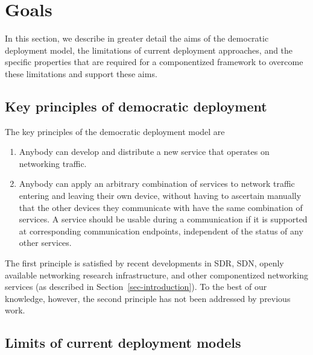 \section{Goals}
\label{sec-goals}

In this section, we describe in greater detail the aims of 
the democratic deployment model, the limitations
of current deployment approaches, and the specific 
properties that are required for a componentized 
framework to overcome these limitations and support these aims. 

\subsection{Key principles of democratic deployment}

The key principles of the democratic deployment model 
are
\begin{enumerate}
\item Anybody can develop and distribute 
a new service that operates on networking
traffic.
\item Anybody can apply an arbitrary combination of services
to network traffic entering and leaving their own device, without 
having to ascertain manually that the other devices they communicate 
with have the same combination of services. 
A service should be usable during a communication 
if it is supported at corresponding communication endpoints, 
independent of the status of any other services.
\end{enumerate}

The first principle is satisfied by recent developments
in SDR, SDN, openly available networking research infrastructure, 
and other componentized networking services 
(as described in Section~\ref{sec-introduction}). 
To the best of our knowledge, however, the second principle
has not been addressed by previous work.

\subsection{Limits of current deployment models}
\label{subsec-goals-limits}


